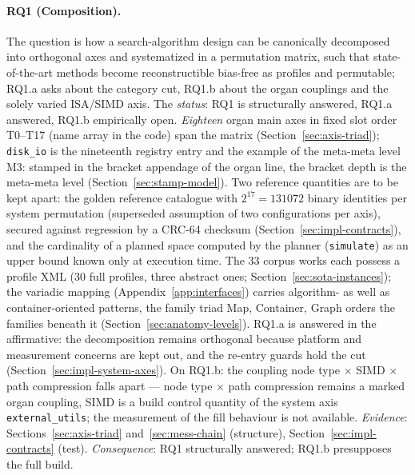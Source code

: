 \begin{nurkurz}
\paragraph{RQ1 (Composition).} The question is how a search-algorithm design can be canonically decomposed
into orthogonal axes and systematized in a permutation matrix, such that state-of-the-art methods become
reconstructible bias-free as profiles and permutable; RQ1.a asks about the category cut, RQ1.b about the
organ couplings and the solely varied ISA/SIMD axis. The \emph{status}: RQ1 is structurally answered, RQ1.a
answered, RQ1.b empirically open.
\emph{Eighteen} organ main axes in fixed slot order T0--T17 (name array
in the code) span the matrix (Section~\ref{sec:axis-triad}); \texttt{disk\_io} is the nineteenth registry
entry and the example of the meta-meta level M3: stamped in the bracket appendage of the organ line, the
bracket depth is the meta-meta level (Section~\ref{sec:stamp-model}). Two reference quantities are to be
kept apart: the golden reference catalogue with $2^{17} = 131072$ binary identities per system permutation (superseded
assumption of two configurations per axis), secured against regression by a CRC-64 checksum
(Section~\ref{sec:impl-contracts}), and the cardinality of a planned space computed by the planner
(\texttt{simulate}) as an upper bound known only at execution time. The 33 corpus works each possess a profile XML
(30 full profiles, three abstract ones; Section~\ref{sec:sota-instances}); the variadic mapping
(Appendix~\ref{app:interfaces}) carries algorithm- as well as container-oriented patterns, the family triad
Map, Container, Graph orders the families beneath it (Section~\ref{sec:anatomy-levels}). RQ1.a is answered in
the affirmative: the decomposition remains orthogonal because platform and measurement concerns are kept
out, and the re-entry guards hold the cut (Section~\ref{sec:impl-system-axes}). On RQ1.b: the coupling node
type $\times$ SIMD $\times$ path compression falls apart --- node type $\times$ path compression remains a
marked organ coupling, SIMD is a build control quantity of the system axis \texttt{external\_utils}; the
measurement of the fill behaviour is not available.
\emph{Evidence}: Sections~\ref{sec:axis-triad}
and~\ref{sec:mess-chain} (structure), Section~\ref{sec:impl-contracts} (test).
\emph{Consequence}: RQ1
structurally answered; RQ1.b presupposes the full build.
\end{nurkurz}

